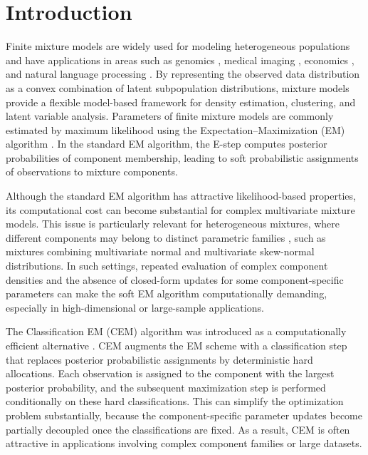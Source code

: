 \documentclass[pdflatex,sn-mathphys-ay]{sn-jnl}%
\theoremstyle{thmstyleone}%
\theoremstyle{thmstyletwo}%
\theoremstyle{thmstylethree}%
\begin{document}



\maketitle

\section{Introduction}

Finite mixture models \citep{mclachlan2000finite} are widely used for modeling heterogeneous populations and have applications in areas such as genomics \citep{pal2025revisiting}, medical imaging \citep{wells1996adaptive}, economics \citep{deb2013finite}, and natural language processing \citep{blei2003latent}. By representing the observed data distribution as a convex combination of latent subpopulation distributions, mixture models provide a flexible model-based framework for density estimation, clustering, and latent variable analysis. Parameters of finite mixture models are commonly estimated by maximum likelihood using the Expectation--Maximization (EM) algorithm \citep{dempster1977maximum}. In the standard EM algorithm, the E-step computes posterior probabilities of component membership, leading to soft probabilistic assignments of observations to mixture components.

Although the standard EM algorithm has attractive likelihood-based properties, its computational cost can become substantial for complex multivariate mixture models. This issue is particularly relevant for heterogeneous mixtures, where different components may belong to distinct parametric families \citep{pal2026flexible}, such as mixtures combining multivariate normal and multivariate skew-normal distributions. In such settings, repeated evaluation of complex component densities and the absence of closed-form updates for some component-specific parameters can make the soft EM algorithm computationally demanding, especially in high-dimensional or large-sample applications.

The Classification EM (CEM) algorithm was introduced as a computationally efficient alternative \citep{celeux1992classification}. CEM augments the EM scheme with a classification step that replaces posterior probabilistic assignments by deterministic hard allocations. Each observation is assigned to the component with the largest posterior probability, and the subsequent maximization step is performed conditionally on these hard classifications. This can simplify the optimization problem substantially, because the component-specific parameter updates become partially decoupled once the classifications are fixed. As a result, CEM is often attractive in applications involving complex component families or large datasets.
\end{document}
